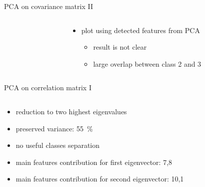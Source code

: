 \documentclass{beamer}
\begin{document}
\begin{frame}{PCA on covariance matrix II}
\begin{columns}[t]
\begin{column}{.5\textwidth}
\end{column}
\begin{column}{.5\textwidth}
\begin{itemize}
\item{
  plot using detected features from PCA
  }
\begin{itemize}
  \item{
    result is not clear
    }
  \item{
    large overlap between class 2 and 3
  }
  \end{itemize}
  \end{itemize}
\end{column}
\end{columns}
\end{frame}

\begin{frame}{PCA on correlation matrix I}
\begin{columns}[t]
\begin{column}{.3\textwidth}
\end{column}
\begin{column}{.3\textwidth}
\end{column}
\begin{column}{.3\textwidth}
\end{column}
\end{columns}

\vspace*{10pt}

\begin{itemize}
	\item{
	reduction to two highest eigenvalues
	}
	\item{
	preserved variance: \SI{55}{\percent}
	}
	\item{
	no useful classes separation
	}
	\item{
	main features contribution for first eigenvector: 7,8
	}
	\item{
	main features contribution for second eigenvector: 10,1
	}
\end{itemize}
\end{frame}
\end{document}
